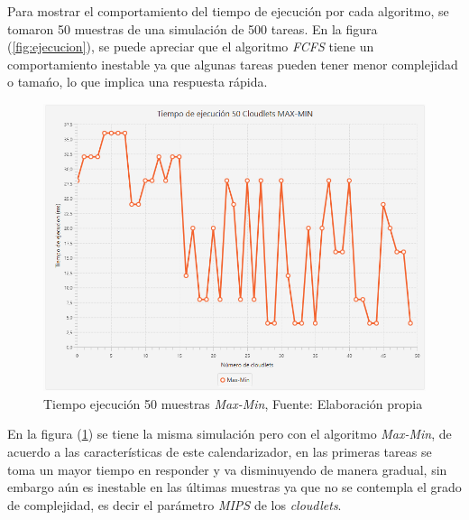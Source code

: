 Para mostrar el comportamiento del tiempo de ejecuci\'on por cada algoritmo, se tomaron 50 muestras de una simulaci\'on de 500 tareas. En la figura (\ref{fig:ejecucion}), se puede apreciar que el algoritmo \textit{FCFS} tiene un comportamiento inestable ya que algunas tareas pueden tener menor complejidad o tama\'no, lo que implica una respuesta r\'apida.

\newpage

\setcounter{figure}{17}
\renewcommand\thefigure{\arabic{figure}}
\begin{figure}[h!] 
	\centering
	\includegraphics[scale=0.5]{media/max-min}
	\caption{Tiempo ejecuci\'on 50 muestras \textit{Max-Min}, Fuente: Elaboraci\'on propia}
	\label{fig:maxmin}
\end{figure}


 En la figura (\ref{fig:maxmin}) se tiene la misma simulaci\'on pero con el algoritmo \textit{Max-Min}, de acuerdo a las caracter\'isticas de este calendarizador, en las primeras tareas se toma un mayor tiempo en responder y va disminuyendo de manera gradual, sin embargo a\'un es inestable en las \'ultimas muestras ya que no se contempla el grado de complejidad, es decir el par\'ametro \textit{MIPS} de los \textit{cloudlets}.



